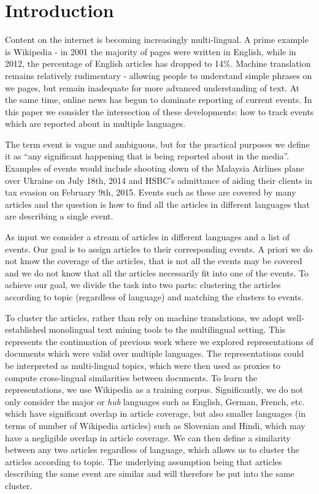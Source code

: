 \documentclass[twoside,11pt]{article}
\begin{document}
\section{Introduction}

Content on the internet is becoming increasingly multi-lingual. A prime example is Wikipedia - in 2001 the majority of pages were written in English, while in 2012, the percentage of English articles has dropped to 14\%. Machine translation remains relatively rudimentary - allowing people to understand simple phrases on we pages, but remain inadequate for more advanced understanding of text. At the same time, online news has begun to dominate reporting of current events. In this paper we consider the intersection of these developments: how to track events which are reported about in multiple languages.

The term event is vague and ambiguous, but for the practical purposes we define it as ``any significant happening that is being reported about in the media''. Examples of events would include shooting down of the Malaysia Airlines plane over Ukraine on July 18th, 2014 and HSBC's admittance of aiding their clients in tax evasion on February 9th, 2015. Events such as these are covered by many articles and the question is how to find all the articles in different languages that are describing a single event.

As input we consider a stream of articles in different languages and a list of events. Our goal is to assign articles to their corresponding events. A priori we do not know the coverage of the articles, that is not all the events may be covered and we do not know that all the articles necessarily fit into one of the events.  To achieve our goal, we divide the task into two parts: clustering the articles according to topic (regardless of language) and matching the clusters to events.

To cluster the articles, rather than rely on machine translations, we adopt well-established monolingual text mining tools to the multilingual setting. This represents the continuation of previous work \cite{nips, iti, nips2, sikdd} where we explored representations of documents which were valid over multiple languages.  The representations could be interpreted as multi-lingual topics, which were then used as proxies to compute cross-lingual similarities between documents. To learn the representations, we use Wikipedia as a training corpus. Significantly, we do not only consider the major or \emph{hub} languages such as English, German, French, etc. which have significant overlap in article coverage, but also smaller languages (in terms of number of Wikipedia articles) such as Slovenian and Hindi, which may have a negligible overlap in article coverage. We can then define a similarity between any two articles regardless of language,  which allows us to cluster the articles according to topic. The underlying assumption being that articles describing the same event are similar  and will therefore be put into the same cluster.
\end{document}
